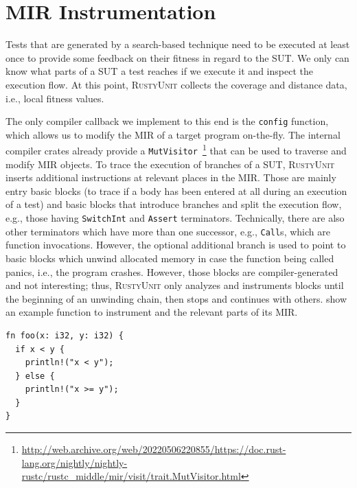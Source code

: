 \documentclass[paper=a4,%
  twoside,%
  BCOR4mm,%
  abstract=true,%
  toc=bibliography,%
  chapterprefix=true,%
  toc=bibliographynumbered,%
  open=right,%
  english,%
  pagesize=pdftex]{scrreprt}
\newcommand{\tech}{\textsc{RustyUnit}\xspace}
\newcommand{\mir}{\ac{MIR}\xspace}
\newcommand{\sut}{\ac{SUT}\xspace}
\begin{document}
\section{MIR Instrumentation}
Tests that are generated by a search-based technique need to be executed at least once to provide some feedback on their fitness in regard to the \sut. We only can know what parts of a \sut a test reaches if we execute it and inspect the execution flow. At this point, \tech collects the coverage and distance data, i.e., local fitness values.

The only compiler callback we implement to this end is the \texttt{config} function, which allows us to modify the \mir of a target program on-the-fly. The internal compiler crates already provide a \texttt{MutVisitor}~\footnote{\url{http://web.archive.org/web/20220506220855/https://doc.rust-lang.org/nightly/nightly-rustc/rustc_middle/mir/visit/trait.MutVisitor.html}} that can be used to traverse and modify \mir objects. To trace the execution of branches of a \sut, \tech inserts additional instructions at relevant places in the \mir. Those are mainly entry basic blocks (to trace if a body has been entered at all during an execution of a test) and basic blocks that introduce branches and split the execution flow, e.g., those having \texttt{SwitchInt} and \texttt{Assert} terminators. Technically, there are also other terminators which have more than one successor, e.g., \texttt{Call}s, which are function invocations. However, the optional additional branch is used to point to basic blocks which unwind allocated memory in case the function being called panics, i.e., the program crashes. However, those blocks are compiler-generated and not interesting; thus, \tech only analyzes and instruments blocks until the beginning of an unwinding chain, then stops and continues with others.  show an example function to instrument and the relevant parts of its \mir.

\begin{lstlisting}[style=boxed, caption={Example function to instrument}, label=lst:example-function-to-instrument]
fn foo(x: i32, y: i32) {
  if x < y {
    println!("x < y");
  } else {
    println!("x >= y");
  }
}
\end{lstlisting}
\end{document}
